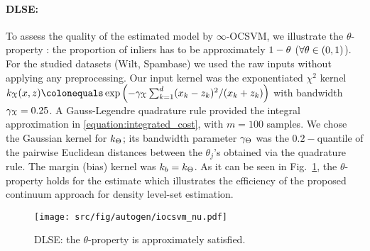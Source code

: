 \paragraph{\ac{DLSE}:}
To assess the quality of the estimated model by $\infty$-\acs{OCSVM}, we
illustrate the $\theta$-property \citep{scholkopf2000new}: the proportion of
inliers has to be approximately $1-\theta$ ($\forall \theta
\in (0,1)$).  For the studied datasets (Wilt, Spambase) we used the raw inputs
without applying any preprocessing.  Our input kernel was the exponentiated
$\chi^2$ kernel $k_{\inputspace}(x, z)\defeq \exp\left(-\gamma_{\inputspace}
\sum_{k=1}^d(x_k - z_k)^2/(x_k + z_k)\right)$ with bandwidth
$\gamma_{\mathcal{X}}=0.25$.  A Gauss-Legendre quadrature rule provided the
integral approximation in \cref{equation:integrated_cost}, with $m=100$
samples. We chose the Gaussian kernel for $k_{\Theta}$; its
bandwidth parameter $\gamma_{\Theta}$ was the $0.2-$quantile of
the pairwise Euclidean distances between the $\theta_j$'s obtained via the
quadrature rule.  The margin (bias) kernel was $k_b=k_{\Theta}$.
As it can be seen in Fig.~\ref{fig:iocsvm_nu_novelty}, the $\theta$-property
holds for the estimate which illustrates the efficiency of the proposed
continuum approach for density level-set estimation.
\begin{figure}[htbp]
    \centering
    \texttt{[image: src/fig/autogen/iocsvm\_nu.pdf]}
    \caption{\acl{DLSE}: the $\theta$-property is
    approximately satisfied. \label{fig:iocsvm_nu_novelty}}
\end{figure}
%
%
